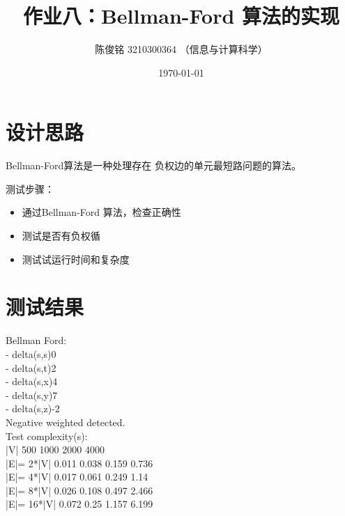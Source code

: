 \documentclass[a4paper]{article}
\title{作业八：Bellman-Ford 算法的实现}
\author{陈俊铭 3210300364 （信息与计算科学）}
\date{\today}
\begin{document}
\maketitle
{}
\section{设计思路}
Bellman-Ford算法是一种处理存在 负权边的单元最短路问题的算法。

测试步骤：
\begin{itemize}
\item 通过Bellman-Ford 算法，检查正确性
\item 测试是否有负权循
\item 测试试运行时间和复杂度
\end{itemize}

\section{测试结果}
\noindent Bellman Ford:\\
- delta(s,s)0\\
- delta(s,t)2\\
- delta(s,x)4\\
- delta(s,y)7\\
- delta(s,z)-2\\

\noindent Negative weighted detected.\\

\noindent Test complexity(s):\\
|V|         500         1000        2000        4000\\
|E|= 2*|V|  0.011       0.038       0.159       0.736\\
|E|= 4*|V|  0.017       0.061       0.249       1.14\\
|E|= 8*|V|  0.026       0.108       0.497       2.466\\
|E|= 16*|V| 0.072       0.25        1.157       6.199\\
\end{document}
